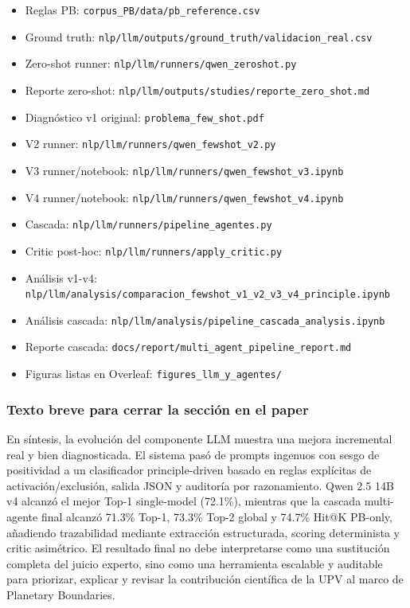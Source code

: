 \begin{itemize}
\item Reglas PB: \texttt{corpus\_PB/data/pb\_reference.csv}
\item Ground truth: \texttt{nlp/llm/outputs/ground\_truth/validacion\_real.csv}
\item Zero-shot runner: \texttt{nlp/llm/runners/qwen\_zeroshot.py}
\item Reporte zero-shot: \texttt{nlp/llm/outputs/studies/reporte\_zero\_shot.md}
\item Diagnóstico v1 original: \texttt{problema\_few\_shot.pdf}
\item V2 runner: \texttt{nlp/llm/runners/qwen\_fewshot\_v2.py}
\item V3 runner/notebook: \texttt{nlp/llm/runners/qwen\_fewshot\_v3.ipynb}
\item V4 runner/notebook: \texttt{nlp/llm/runners/qwen\_fewshot\_v4.ipynb}
\item Cascada: \texttt{nlp/llm/runners/pipeline\_agentes.py}
\item Critic post-hoc: \texttt{nlp/llm/runners/apply\_critic.py}
\item Análisis v1-v4: \texttt{nlp/llm/analysis/comparacion\_fewshot\_v1\_v2\_v3\_v4\_principle.ipynb}
\item Análisis cascada: \texttt{nlp/llm/analysis/pipeline\_cascada\_analysis.ipynb}
\item Reporte cascada: \texttt{docs/report/multi\_agent\_pipeline\_report.md}
\item Figuras listas en Overleaf: \texttt{figures_llm_y_agentes/}
\end{itemize}

\subsubsection*{Texto breve para cerrar la sección en el paper}

En síntesis, la evolución del componente LLM muestra una mejora incremental real y bien diagnosticada. El sistema pasó de prompts ingenuos con sesgo de positividad a un clasificador principle-driven basado en reglas explícitas de activación/exclusión, salida JSON y auditoría por razonamiento. Qwen 2.5 14B v4 alcanzó el mejor Top-1 single-model (72.1\%), mientras que la cascada multi-agente final alcanzó 71.3\% Top-1, 73.3\% Top-2 global y 74.7\% Hit@K PB-only, añadiendo trazabilidad mediante extracción estructurada, scoring determinista y critic asimétrico. El resultado final no debe interpretarse como una sustitución completa del juicio experto, sino como una herramienta escalable y auditable para priorizar, explicar y revisar la contribución científica de la UPV al marco de Planetary Boundaries.


